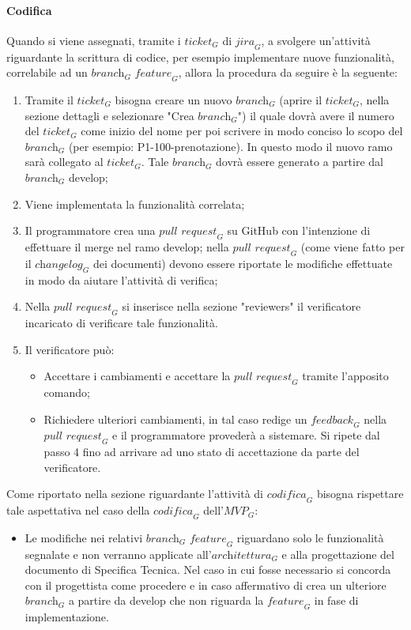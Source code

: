 \paragraph{Codifica}
Quando si viene assegnati, tramite i $\textit{ticket}_G$ di $\textit{jira}_G$, a svolgere un'attività riguardante la scrittura di codice, per esempio implementare nuove funzionalità, correlabile ad un $\textit{branch}_G$ $\textit{feature}_G$, allora la procedura da seguire è la seguente:
\begin{enumerate}
    \item Tramite il $\textit{ticket}_G$ bisogna creare un nuovo $\textit{branch}_G$ (aprire il $\textit{ticket}_G$, nella sezione dettagli e selezionare "Crea $\textit{branch}_G$") il quale dovrà avere il numero del $\textit{ticket}_G$ come inizio del nome per poi scrivere in modo conciso lo scopo del $\textit{branch}_G$ (per esempio: P1-100-prenotazione). In questo modo il nuovo ramo sarà collegato al $\textit{ticket}_G$. Tale $\textit{branch}_G$ dovrà essere generato a partire dal $\textit{branch}_G$ develop;
    \item Viene implementata la funzionalità correlata;
    \item Il programmatore crea una $\textit{pull request}_G$ su GitHub con l'intenzione di effettuare il merge nel ramo develop; nella $\textit{pull request}_G$ (come viene fatto per il $\textit{changelog}_G$ dei documenti) devono essere riportate le modifiche effettuate in modo da aiutare l'attività di verifica;
    \item Nella $\textit{pull request}_G$ si inserisce nella sezione "reviewers" il verificatore incaricato di verificare tale funzionalità.
    \item Il verificatore può: 
    \begin{itemize}
        \item Accettare i cambiamenti e accettare la $\textit{pull request}_G$ tramite l'apposito comando;
        \item Richiedere ulteriori cambiamenti, in tal caso redige un $\textit{feedback}_G$ nella $\textit{pull request}_G$ e il programmatore provederà a sistemare. Si ripete dal passo 4 fino ad arrivare ad uno stato di accettazione da parte del verificatore.
    \end{itemize}
\end{enumerate}



Come riportato nella sezione riguardante l'attività di $\textit{codifica}_G$ bisogna rispettare tale aspettativa nel caso della $\textit{codifica}_G$ dell'$\textit{MVP}_G$:
\begin{itemize}
    \item Le modifiche nei relativi $\textit{branch}_G$ $\textit{feature}_G$ riguardano solo le funzionalità segnalate e non verranno applicate all'$\textit{architettura}_G$ e alla progettazione del documento di Specifica Tecnica. Nel caso in cui fosse necessario si concorda con il progettista come procedere e in caso affermativo di crea un ulteriore $\textit{branch}_G$ a partire da develop che non riguarda la $\textit{feature}_G$ in fase di implementazione.
\end{itemize}

